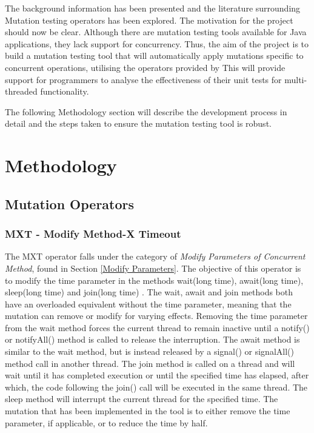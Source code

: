 \documentclass[a4paper,12pt]{article}
\begin{document}
The background information has been presented and the literature surrounding Mutation testing operators has been explored. The motivation for the project should now be clear. Although there are mutation testing tools available for Java applications, they lack support for concurrency. Thus, the aim of the project is to build a mutation testing tool that will automatically apply mutations specific to concurrent operations, utilising the operators provided by \citeauthor{bradbury06} This will provide support for programmers to analyse the effectiveness of their unit tests for multi-threaded functionality.

The following Methodology section will describe the development process in detail and the steps taken to ensure the mutation testing tool is robust.   



\newpage
\section{Methodology}
\subsection{Mutation Operators}


\subsubsection{MXT - Modify Method-X Timeout}

The MXT operator falls under the category of \textit{Modify Parameters of Concurrent Method}, found in Section \ref{Modify Parameters}. The objective of this operator is to modify the time parameter in the methods wait(long time), await(long time), sleep(long time) and join(long time) \citep{bradbury06}. The wait, await and join methods both have an overloaded equivalent without the time parameter, meaning that the mutation can remove or modify for varying effects. Removing the time parameter from the wait method forces the current thread to remain inactive until a notify() or notifyAll() method is called to release the interruption. The await method is similar to the wait method, but is instead released by a signal() or signalAll() method call in another thread. The join method is called on a thread and will wait until it has completed execution or until the specified time has elapsed, after which, the code following the join() call will be executed in the same thread. The sleep method will interrupt the current thread for the specified time. The mutation that has been implemented in the tool is to either remove the time parameter, if applicable, or to reduce the time by half.        
\end{document}
